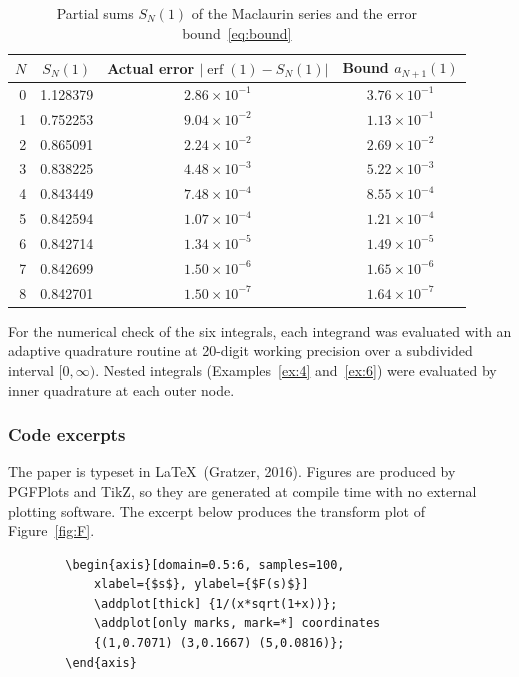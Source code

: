 \documentclass[12pt,a4paper]{article}
\theoremstyle{definition}
\theoremstyle{plain}
\theoremstyle{remark}
\newcommand{\erf}{\operatorname{erf}}
\begin{document}
	\begin{table}[htbp]
		\centering
		\caption{Partial sums $S_N(1)$ of the Maclaurin series and the error bound~\eqref{eq:bound}}
		\label{tab:partial}
		\renewcommand{\arraystretch}{1.15}
		\begin{tabular}{rccc}
			\toprule
			$N$ & $S_N(1)$ & Actual error $|\erf(1)-S_N(1)|$ & Bound $a_{N+1}(1)$ \\
			\midrule
			0 & 1.128379 & $2.86\times10^{-1}$ & $3.76\times10^{-1}$ \\
			1 & 0.752253 & $9.04\times10^{-2}$ & $1.13\times10^{-1}$ \\
			2 & 0.865091 & $2.24\times10^{-2}$ & $2.69\times10^{-2}$ \\
			3 & 0.838225 & $4.48\times10^{-3}$ & $5.22\times10^{-3}$ \\
			4 & 0.843449 & $7.48\times10^{-4}$ & $8.55\times10^{-4}$ \\
			5 & 0.842594 & $1.07\times10^{-4}$ & $1.21\times10^{-4}$ \\
			6 & 0.842714 & $1.34\times10^{-5}$ & $1.49\times10^{-5}$ \\
			7 & 0.842699 & $1.50\times10^{-6}$ & $1.65\times10^{-6}$ \\
			8 & 0.842701 & $1.50\times10^{-7}$ & $1.64\times10^{-7}$ \\
			\bottomrule
		\end{tabular}
	\end{table}
	
	For the numerical check of the six integrals, each integrand was evaluated with an adaptive quadrature routine at 20-digit working precision over a subdivided interval $[0,\infty)$. Nested integrals (Examples~\ref{ex:4} and~\ref{ex:6}) were evaluated by inner quadrature at each outer node.
	
	\subsubsection{Code excerpts}
	
	The paper is typeset in \LaTeX\ (Gratzer, 2016). Figures are produced by PGFPlots and TikZ, so they are generated at compile time with no external plotting software. The excerpt below produces the transform plot of Figure~\ref{fig:F}.
	
	\begin{lstlisting}
		\begin{axis}[domain=0.5:6, samples=100,
			xlabel={$s$}, ylabel={$F(s)$}]
			\addplot[thick] {1/(x*sqrt(1+x))};
			\addplot[only marks, mark=*] coordinates
			{(1,0.7071) (3,0.1667) (5,0.0816)};
		\end{axis}
	\end{lstlisting}
	
\end{document}
